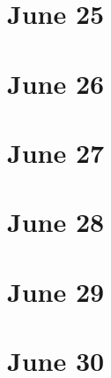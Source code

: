 \section{June 25}

\section{June 26}

\section{June 27}

\section{June 28}

\section{June 29}

\section{June 30}

